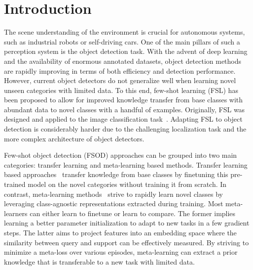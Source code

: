 \documentclass[10pt,twocolumn,letterpaper]{article}
\begin{document}
\section{Introduction}

The scene understanding of the environment is crucial for autonomous systems, such as industrial robots or self-driving cars.
One of the main pillars of such a perception system is the object detection task. 
With the advent of deep learning and the availability of enormous annotated datasets, object detection methods are rapidly improving in terms of both efficiency and detection performance. 
However, current object detectors do not generalize well when learning novel unseen categories with limited data. 
To this end, few-shot learning (FSL) has been proposed to allow for improved knowledge transfer from base classes with abundant data to novel classes with a handful of examples. 
Originally, FSL was designed and applied to the image classification task~\cite{vinyals2016matching,snell2017prototypical,finn2017model,ravi2017optimization,sung2018learning,garcia2018few,qi2018low, antoniou2018data,hariharan2017low,wang2018low}.
Adapting FSL to object detection is considerably harder due to the challenging localization task and the more complex architecture of object detectors. 

Few-shot object detection (FSOD) approaches can be grouped into two main categories: transfer learning and meta-learning based methods.
Transfer learning based approaches~\cite{LSTD, TFA, MPSR, FSCE, defrcn} transfer knowledge from base classes by finetuning this pre-trained model on the novel categories without training it from scratch.
In contrast, meta-learning methods~\cite{DANA, CME, FsDetView, FSOD-RPN, MetaRCNN, FSRW, MetaDet, DCNET} strive to rapidly learn novel classes by leveraging class-agnostic representations extracted during training. 
Most meta-learners can either learn to finetune or learn to compare. 
The former implies learning a better parameter initialization to adapt to new tasks in a few gradient steps. 
The latter aims to project features into an embedding space where the similarity between query and support can be effectively measured. 
By striving to minimize a meta-loss over various episodes, meta-learning can extract a prior knowledge that is transferable to a new task with limited data.
\end{document}
